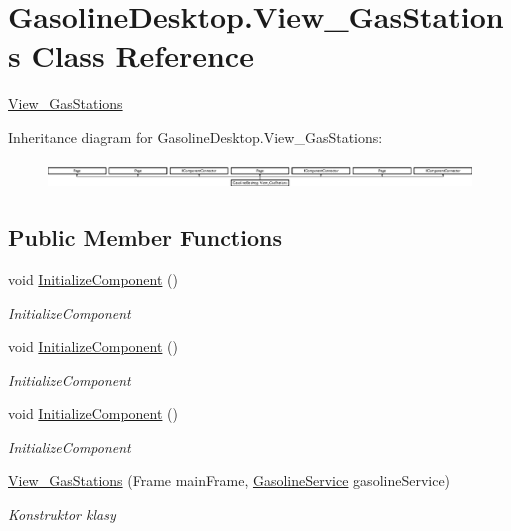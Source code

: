 \hypertarget{class_gasoline_desktop_1_1_view___gas_stations}{}\section{Gasoline\+Desktop.\+View\+\_\+\+Gas\+Stations Class Reference}
\label{class_gasoline_desktop_1_1_view___gas_stations}


\mbox{\hyperlink{class_gasoline_desktop_1_1_view___gas_stations}{View\+\_\+\+Gas\+Stations}}  


Inheritance diagram for Gasoline\+Desktop.\+View\+\_\+\+Gas\+Stations\+:\begin{figure}[H]
\begin{center}
\leavevmode
\includegraphics[height=0.730594cm]{class_gasoline_desktop_1_1_view___gas_stations}
\end{center}
\end{figure}
\subsection*{Public Member Functions}
\begin{DoxyCompactItemize}
\item 
void \mbox{\hyperlink{class_gasoline_desktop_1_1_view___gas_stations_a01a630b5a5fd1d7741b967986e45a18b}{Initialize\+Component}} ()
\begin{DoxyCompactList}\small\item\em Initialize\+Component \end{DoxyCompactList}\item 
void \mbox{\hyperlink{class_gasoline_desktop_1_1_view___gas_stations_a01a630b5a5fd1d7741b967986e45a18b}{Initialize\+Component}} ()
\begin{DoxyCompactList}\small\item\em Initialize\+Component \end{DoxyCompactList}\item 
void \mbox{\hyperlink{class_gasoline_desktop_1_1_view___gas_stations_a01a630b5a5fd1d7741b967986e45a18b}{Initialize\+Component}} ()
\begin{DoxyCompactList}\small\item\em Initialize\+Component \end{DoxyCompactList}\item 
\mbox{\hyperlink{class_gasoline_desktop_1_1_view___gas_stations_ab4444d99a2e751821b3aacd11d405c1b}{View\+\_\+\+Gas\+Stations}} (Frame main\+Frame, \mbox{\hyperlink{class_gasoline_desktop_1_1_gasoline_service}{Gasoline\+Service}} gasoline\+Service)
\begin{DoxyCompactList}\small\item\em Konstruktor klasy \end{DoxyCompactList}\end{DoxyCompactItemize}


